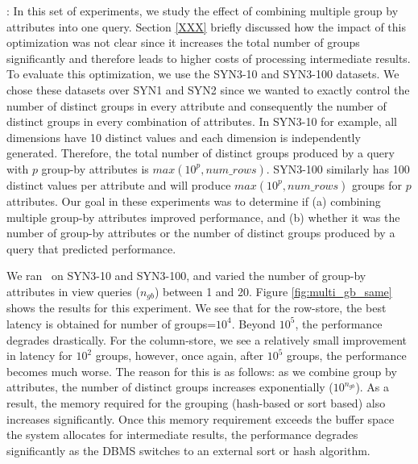 : In this set of experiments, we
study the effect of combining multiple group by attributes into one query.
Section \ref{XXX} briefly discussed how the impact of this optimization was not
clear since it increases the total number of groups significantly and therefore
leads to higher costs of processing intermediate results.
To evaluate this optimization, we use the SYN3-10 and SYN3-100 datasets.
We chose these datasets over SYN1 and SYN2 since we wanted to exactly control
the number of distinct groups in every attribute and consequently the number of
distinct groups in every combination of attributes.
In SYN3-10 for example, all dimensions have 10 distinct values and each
dimension is independently generated. 
Therefore, the total number of distinct
groups produced by a query with $p$ group-by attributes is $max(10^p,
num\_rows)$.
SYN3-100 similarly has 100 distinct values per attribute and will produce
$max(10^p, num\_rows)$ groups for $p$ attributes.
Our goal in these experiments was to determine if (a) combining multiple
group-by attributes improved performance, and (b) whether it was the number of
group-by attributes or the number of distinct groups produced by a query that
predicted performance.

We ran \VizRecDB\ on SYN3-10 and SYN3-100, and varied the number of
group-by attributes in view queries ($n_{gb}$) between 1 and 20.
Figure \ref{fig:multi_gb_same} shows the results for this experiment.
We see that for the row-store, the best latency is obtained for number of
groups=$10^4$.
Beyond $10^5$, the performance degrades drastically.    For the column-store, we see a
relatively small improvement in latency for $10^2$ groups, however, once again,
after $10^5$ groups, the performance becomes much worse.
The reason for this is as follows: as we combine group by attributes, the number
of distinct groups increases exponentially ($10^{n_{gb}}$).
As a result, the memory required for the grouping (hash-based or sort based)
also increases significantly.
Once this memory requirement exceeds the buffer space the system allocates for
intermediate results, the performance degrades significantly as the DBMS
switches to an external sort or hash algorithm.


